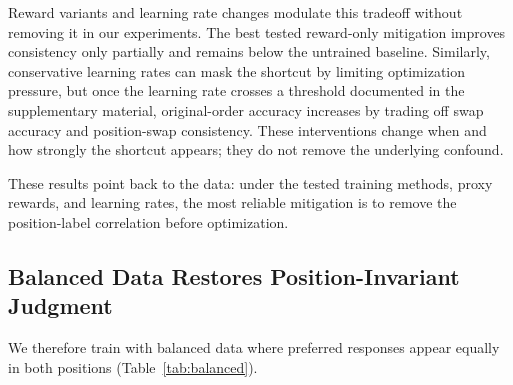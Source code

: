 \documentclass[letterpaper]{article}
\begin{document}
Reward variants and learning rate changes modulate this tradeoff without removing it in our experiments. The best tested reward-only mitigation improves consistency only partially and remains below the untrained baseline. Similarly, conservative learning rates can mask the shortcut by limiting optimization pressure, but once the learning rate crosses a threshold documented in the supplementary material, original-order accuracy increases by trading off swap accuracy and position-swap consistency. These interventions change when and how strongly the shortcut appears; they do not remove the underlying confound.

These results point back to the data: under the tested training methods, proxy rewards, and learning rates, the most reliable mitigation is to remove the position-label correlation before optimization.

\subsection{Balanced Data Restores Position-Invariant Judgment}

We therefore train with balanced data where preferred responses appear equally in both positions (Table~\ref{tab:balanced}).

\begin{table}[t]
\centering
\scriptsize
\setlength{\tabcolsep}{2.0pt}
\caption{Balanced training (gold = 50\% A, 50\% B). Data deconfounding keeps first-position selection near 50\%, restores consistency, and makes original-order and swap accuracy much closer.}
\label{tab:balanced}
\end{table}
\end{document}
